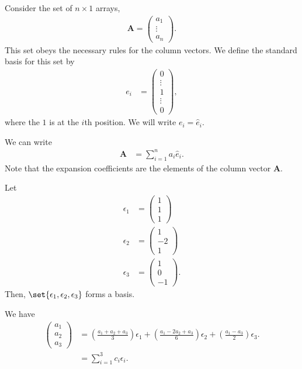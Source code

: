 \documentclass[10pt]{mypackage}
\begin{document}
\begin{example}
Consider the set of $n\times 1$ arrays,
\begin{align*}
  \mathbf{A} = \begin{pmatrix}a_1\\\vdots\\a_n\end{pmatrix}.
\end{align*}
This set obeys the necessary rules for the column vectors. We define the standard basis for this set by
\begin{align*}
  e_i &= \begin{pmatrix}0\\\vdots\\1\\\vdots\\0\end{pmatrix},
\end{align*}
where the $1$ is at the $i$th position. We will write $e_i = \widehat{e}_i$.\newline

We can write
\begin{align*}
  \mathbf{A} &= \sum_{i=1}^{n}a_i\widehat{e}_i.
\end{align*}
Note that the expansion coefficients are the elements of the column vector $\mathbf{A}$.
\end{example}
\begin{example}
  Let
  \begin{align*}
    \epsilon_1 &= \begin{pmatrix}1\\1\\1\end{pmatrix}\\
    \epsilon_2 &= \begin{pmatrix}1\\-2\\1\end{pmatrix}\\
    \epsilon_3 &= \begin{pmatrix}1\\0\\-1\end{pmatrix}.
  \end{align*}
  Then, $\set{\epsilon_1,\epsilon_2,\epsilon_3}$ forms a basis.\newline

  We have
  \begin{align*}
    \begin{pmatrix}a_1\\a_2\\a_3\end{pmatrix} &= \left(\frac{a_1 + a_2 + a_3}{3}\right)\epsilon_1 + \left(\frac{a_1 - 2a_2 + a_3}{6}\right)\epsilon_2 + \left(\frac{a_1 - a_3}{2}\right)\epsilon_3.\\
                                              &= \sum_{i=1}^{3}c_i\epsilon_i.
  \end{align*}
\end{example}
\end{document}

